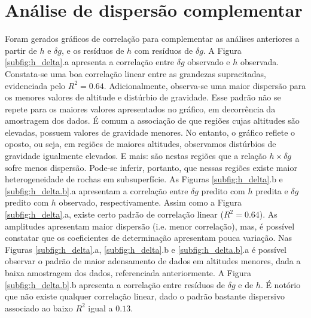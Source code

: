 \section{Análise de dispersão complementar}

Foram gerados gráficos de correlação para complementar as análises anteriores a partir de $h$ e $\delta g$, e os resíduos de $h$ com resíduos de $\delta g$. A Figura \ref{subfig:h_delta}.a apresenta a correlação entre $\delta g$ observado e $h$ observada. Constata-se uma boa correlação linear entre as grandezas supracitadas, evidenciada pelo $R^{2} = 0.64$. Adicionalmente, observa-se uma maior dispersão para os menores valores de altitude e distúrbio de gravidade. Esse padrão não se repete para os maiores valores apresentados no gráfico, em decorrência da amostragem dos dados. É comum a associação de que regiões cujas altitudes são elevadas, possuem valores de gravidade menores. No entanto, o gráfico reflete o oposto, ou seja, em regiões de maiores altitudes, observamos distúrbios de gravidade igualmente elevados. E mais: são nestas regiões que a relação $h \times \delta g$ sofre menos dispersão. Pode-se inferir, portanto, que nessas regiões existe maior heterogeneidade de rochas em subsuperfície. As Figuras \ref{subfig:h_delta}.b e \ref{subfig:h_delta.b}.a apresentam a correlação entre $\delta g$ predito com $h$ predita e $\delta g$ predito com $h$ observado, respectivamente. Assim como a Figura \ref{subfig:h_delta}.a, existe certo padrão de correlação linear ($R^{2} = 0.64$). As amplitudes apresentam maior dispersão (i.e. menor correlação), mas, é possível constatar que os coeficientes de determinação apresentam pouca variação. Nas Figuras \ref{subfig:h_delta}.a, \ref{subfig:h_delta}.b e \ref{subfig:h_delta.b}.a é possível observar o padrão de maior adensamento de dados em altitudes menores, dada a baixa amostragem dos dados, referenciada anteriormente. A Figura \ref{subfig:h_delta.b}.b apresenta a correlação entre resíduos de $\delta g$ e de $h$. É notório que não existe qualquer correlação linear, dado o padrão bastante dispersivo associado ao baixo $R^{2}$ igual a $0.13$.

